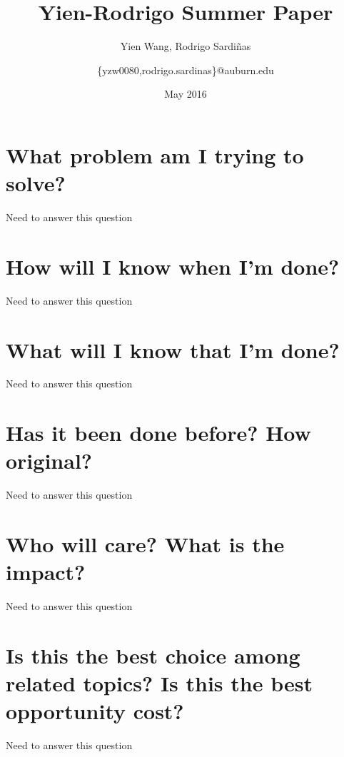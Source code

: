 \documentclass{article}
\title{Yien-Rodrigo Summer Paper}
\author{Yien Wang, Rodrigo Sardi\~nas
        \and{ \{yzw0080,rodrigo.sardinas\}@auburn.edu} }
\date{May 2016}
\begin{document}
\maketitle
\tableofcontents

\section{What problem am I trying to solve?}
\label{sec:q1}
Need to answer this question

\section{How will I know when I'm done?}
\label{sec:q2}
Need to answer this question

\section{What will I know that I'm done?}
\label{sec:q3}
Need to answer this question

\section{Has it been done before? How original?}
\label{sec:q4}
Need to answer this question

\section{Who will care? What is the impact?}
\label{sec:q5}    
Need to answer this question

\section{Is this the best choice among related topics? Is this the best opportunity cost?}
\label{sec:q6}
Need to answer this question
\end{document}
